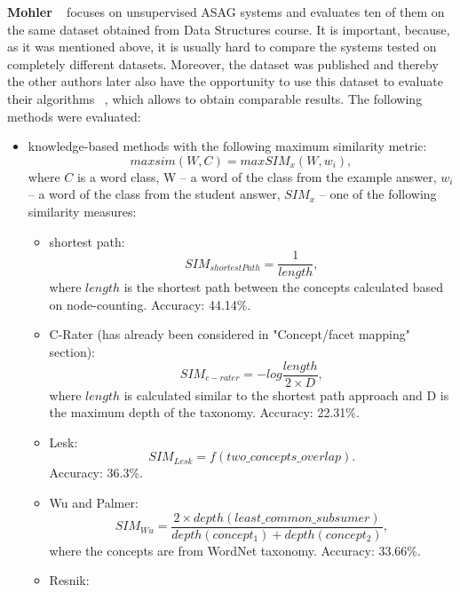 \textbf{Mohler} ~\cite{Mohler} focuses on unsupervised ASAG systems and evaluates ten of them on the same dataset obtained from  Data Structures course. It is important, because, as it was mentioned above, it is usually hard to compare the  systems tested on completely different datasets. Moreover, the dataset was published and thereby the other authors later also have the opportunity to use this dataset to evaluate their algorithms ~\cite{Sultan}, which allows to obtain comparable results. The following methods were evaluated: 
\begin{itemize}
\item knowledge-based methods with the following maximum similarity metric:
\begin{equation} \label{eq:maxsim}
maxsim(W,C) = max SIM_x(W,w_i),
\end{equation}
where $C$ is a word class, W -- a word of the class from the example answer, $w_i$ -- a word of the class from the student answer, $SIM_x$ -- one of the following similarity measures:
\begin{itemize}
\item shortest path:
\begin{equation} \label{eq:shortestPath}
SIM_{shortestPath} = \frac{1}{length},
\end{equation}
where $length$ is the shortest path between the concepts calculated based on node-counting. Accuracy: 44.14\%.
\item C-Rater (has already been considered in "Concept/facet mapping" section):
\begin{equation} \label{eq:c-rater}
SIM_{c-rater} = -log \frac{length}{2 \times D},
\end{equation}
where $length$ is calculated similar to the shortest path approach and D is the maximum depth of the taxonomy. Accuracy: 22.31\%.
\item Lesk:
\begin{equation} \label{eq:Lesk}
SIM_{Lesk} = f(two\_concepts\_overlap).
\end{equation}
Accuracy: 36.3\%.
\item Wu and Palmer:
\begin{equation} \label{eq:Wu}
SIM_{Wu} = \frac{2 \times depth(least\_common\_subsumer)}{depth(concept_1) + depth(concept_2)},
\end{equation}
where the concepts are from WordNet taxonomy. Accuracy: 33.66\%.
\item Resnik:
\begin{equation} \label{eq:Resnik}

\end{equation}
\end{itemize}
\end{itemize}
